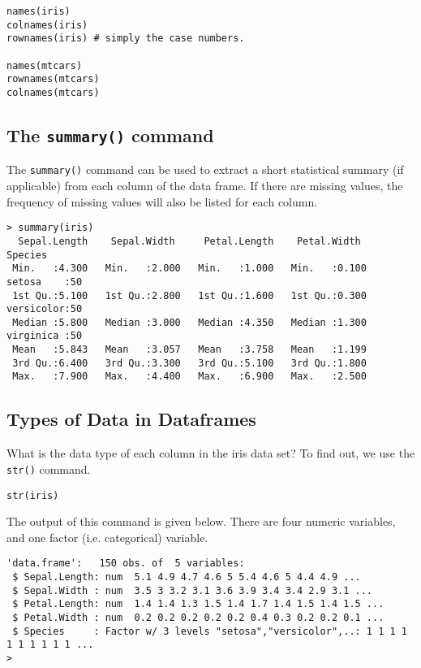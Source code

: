\documentclass[12pt]{article}
\begin{document}
\begin{framed}
\begin{verbatim}
names(iris)
colnames(iris)
rownames(iris) # simply the case numbers.

names(mtcars)
rownames(mtcars)
colnames(mtcars)
\end{verbatim}
\end{framed}

\newpage
\subsection*{The \texttt{summary()} command}
The \texttt{summary()} command can be used to extract a short statistical summary (if applicable) from each column of the data frame. 
If there are missing values, the frequency of missing values will also be listed for each column.

\begin{verbatim}
> summary(iris)
  Sepal.Length    Sepal.Width     Petal.Length    Petal.Width          Species  
 Min.   :4.300   Min.   :2.000   Min.   :1.000   Min.   :0.100   setosa    :50  
 1st Qu.:5.100   1st Qu.:2.800   1st Qu.:1.600   1st Qu.:0.300   versicolor:50  
 Median :5.800   Median :3.000   Median :4.350   Median :1.300   virginica :50  
 Mean   :5.843   Mean   :3.057   Mean   :3.758   Mean   :1.199                  
 3rd Qu.:6.400   3rd Qu.:3.300   3rd Qu.:5.100   3rd Qu.:1.800                  
 Max.   :7.900   Max.   :4.400   Max.   :6.900   Max.   :2.500                
\end{verbatim}


\newpage
\subsection*{Types of Data in Dataframes}
What is the data type of each column in the iris data set? To find out, we use the \texttt{str()} command.

\begin{framed}
\begin{verbatim}
str(iris)
\end{verbatim}
\end{framed}
The output of this command is given below. There are four numeric variables, and one factor (i.e. categorical) variable.
\begin{verbatim}
'data.frame':   150 obs. of  5 variables:
 $ Sepal.Length: num  5.1 4.9 4.7 4.6 5 5.4 4.6 5 4.4 4.9 ...
 $ Sepal.Width : num  3.5 3 3.2 3.1 3.6 3.9 3.4 3.4 2.9 3.1 ...
 $ Petal.Length: num  1.4 1.4 1.3 1.5 1.4 1.7 1.4 1.5 1.4 1.5 ...
 $ Petal.Width : num  0.2 0.2 0.2 0.2 0.2 0.4 0.3 0.2 0.2 0.1 ...
 $ Species     : Factor w/ 3 levels "setosa","versicolor",..: 1 1 1 1 1 1 1 1 1 1 ...
> 
\end{verbatim}
\end{document}

